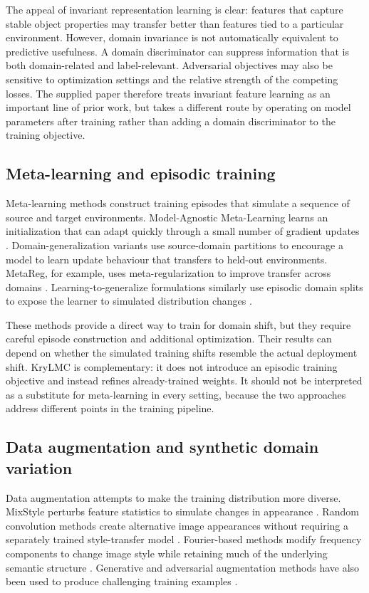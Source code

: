\documentclass[11pt,a4paper]{article}
\begin{document}
The appeal of invariant representation learning is clear: features that capture stable object properties may transfer better than features tied to a particular environment. However, domain invariance is not automatically equivalent to predictive usefulness. A domain discriminator can suppress information that is both domain-related and label-relevant. Adversarial objectives may also be sensitive to optimization settings and the relative strength of the competing losses. The supplied paper therefore treats invariant feature learning as an important line of prior work, but takes a different route by operating on model parameters after training rather than adding a domain discriminator to the training objective.

\subsection{Meta-learning and episodic training}
Meta-learning methods construct training episodes that simulate a sequence of source and target environments. Model-Agnostic Meta-Learning learns an initialization that can adapt quickly through a small number of gradient updates \cite{finn2017maml}. Domain-generalization variants use source-domain partitions to encourage a model to learn update behaviour that transfers to held-out environments. MetaReg, for example, uses meta-regularization to improve transfer across domains \cite{balaji2018metareg}. Learning-to-generalize formulations similarly use episodic domain splits to expose the learner to simulated distribution changes \cite{li2018learninggeneralize}.

These methods provide a direct way to train for domain shift, but they require careful episode construction and additional optimization. Their results can depend on whether the simulated training shifts resemble the actual deployment shift. KryLMC is complementary: it does not introduce an episodic training objective and instead refines already-trained weights. It should not be interpreted as a substitute for meta-learning in every setting, because the two approaches address different points in the training pipeline.

\subsection{Data augmentation and synthetic domain variation}
Data augmentation attempts to make the training distribution more diverse. MixStyle perturbs feature statistics to simulate changes in appearance \cite{zhou2021mixstyle}. Random convolution methods create alternative image appearances without requiring a separately trained style-transfer model \cite{xu2021randomconv}. Fourier-based methods modify frequency components to change image style while retaining much of the underlying semantic structure \cite{xu2021fourier}. Generative and adversarial augmentation methods have also been used to produce challenging training examples \cite{volpi2018adversarial,zhou2020deep}.
\end{document}
